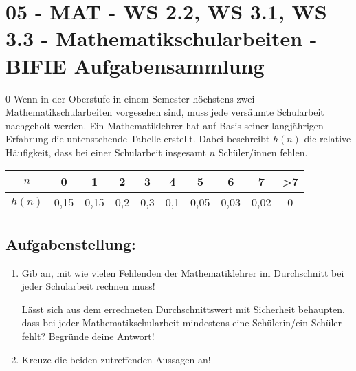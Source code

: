 \section{05 - MAT - WS 2.2, WS 3.1, WS 3.3 - Mathematikschularbeiten - BIFIE Aufgabensammlung}

\begin{langesbeispiel} \item[0] %
				Wenn in der Oberstufe in einem Semester höchstens zwei Mathematikschularbeiten vorgesehen sind, muss jede versäumte Schularbeit nachgeholt werden.
				Ein Mathematiklehrer hat auf Basis seiner langjährigen Erfahrung die untenstehende Tabelle erstellt. Dabei beschreibt $h(n)$ die relative Häufigkeit, dass bei einer Schularbeit insgesamt $n$ Schüler/innen fehlen. 
				\leer
				
\begin{center}
				\begin{tabular}{|c|c|c|c|c|c|c|c|c|c|} \hline
				$n$&0&1&2&3&4&5&6&7&>7\\ \hline
				$h(n)$&0,15&0,15&0,2&0,3&0,1&0,05&0,03&0,02&0\\ \hline
				\end{tabular}	
\end{center}
			

\subsection{Aufgabenstellung:}
\begin{enumerate}
	\item Gib an, mit wie vielen Fehlenden der Mathematiklehrer im Durchschnitt bei jeder Schularbeit rechnen muss!
	
	Lässt sich aus dem errechneten Durchschnittswert mit Sicherheit behaupten, dass bei jeder Mathematikschularbeit mindestens eine Schülerin/ein Schüler fehlt? Begründe deine Antwort!
	\item Kreuze die beiden zutreffenden Aussagen an!
	
					

\end{enumerate}
\end{langesbeispiel}
